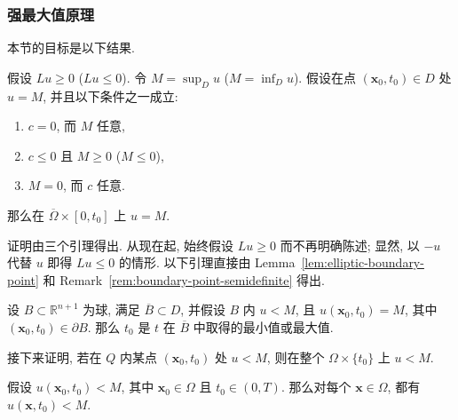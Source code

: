 \subsubsection{强最大值原理}\label{subsec:parabolic-strong-maximum}

本节的目标是以下结果.

\begin{Theorem}
\label{thm:parabolic-strong-maximum}
假设 $Lu\geq0$ ($Lu\leq0$). 令 $M=\sup_Du$ ($M=\inf_Du$). 假设在点 $(\bm{x}_0,t_0)\in D$ 处 $u=M$, 并且以下条件之一成立:
\begin{enumerate}
\item $c=0$, 而 $M$ 任意,
\item $c\leq0$ 且 $M\geq0$ ($M\leq0$),
\item $M=0$, 而 $c$ 任意.
\end{enumerate}
那么在 $\overline\Omega\times[0,t_0]$ 上 $u=M$.
\end{Theorem}

证明由三个引理得出. 从现在起, 始终假设 $Lu\geq0$ 而不再明确陈述; 显然, 以 $-u$ 代替 $u$ 即得 $Lu\leq0$ 的情形. 以下引理直接由 Lemma~\ref{lem:elliptic-boundary-point} 和 Remark~\ref{rem:boundary-point-semidefinite} 得出.

\begin{Lemma}
\label{lem:parabolic-ball-extreme-time}
设 $B\subset\mathbb{R}^{n+1}$ 为球, 满足 $\overline B\subset D$, 并假设 $B$ 内 $u<M$, 且 $u(\bm{x}_0,t_0)=M$, 其中 $(\bm{x}_0,t_0)\in\partial B$. 那么 $t_0$ 是 $t$ 在 $\overline B$ 中取得的最小值或最大值.
\end{Lemma}

接下来证明, 若在 $Q$ 内某点 $(\bm{x}_0,t_0)$ 处 $u<M$, 则在整个 $\Omega\times\{t_0\}$ 上 $u<M$.

\begin{Lemma}
\label{lem:parabolic-slice-strictness}
假设 $u(\bm{x}_0,t_0)<M$, 其中 $\bm{x}_0\in\Omega$ 且 $t_0\in(0,T)$. 那么对每个 $\bm{x}\in\Omega$, 都有 $u(\bm{x},t_0)<M$.
\end{Lemma}

